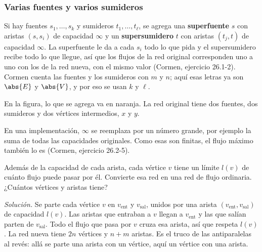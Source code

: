 \documentclass[11pt,letterpaper]{article}
\begin{document}
\subsubsection*{Varias fuentes y varios sumideros}

Si hay fuentes $s_1, \dots, s_k$ y sumideros $t_1, \dots, t_\ell$, se
agrega una \textbf{superfuente} $s$ con aristas $(s, s_i)$ de
capacidad $\infty$ y un \textbf{supersumidero} $t$ con aristas
$(t_j, t)$ de capacidad $\infty$. La superfuente le da a cada $s_i$
todo lo que pida y el supersumidero recibe todo lo que llegue, así que
los flujos de la red original corresponden uno a uno con los de la red
nueva, con el mismo valor (Cormen, ejercicio 26.1-2). Cormen cuenta
las fuentes y los sumideros con $m$ y $n$; aquí esas letras ya son
$\abs{E}$ y $\abs{V}$, y por eso se usan $k$ y $\ell$.

En la figura, lo que se agrega va en naranja. La red original tiene
dos fuentes, dos sumideros y dos vértices intermedios, $x$ y $y$.

\begin{center}
\end{center}

En una implementación, $\infty$ se reemplaza por un número grande, por
ejemplo la suma de todas las capacidades originales. Como esas son
finitas, el flujo máximo también lo es (Cormen, ejercicio 26.2-5).

\begin{ejercicio}
  Además de la capacidad de cada arista, cada vértice $v$ tiene un
  límite $l(v)$ de cuánto flujo puede pasar por él. Convierte esa red
  en una red de flujo ordinaria. ¿Cuántos vértices y aristas tiene?

  \textit{Solución.} Se parte cada vértice $v$ en $v_{\text{ent}}$ y
  $v_{\text{sal}}$, unidos por una arista $(v_{\text{ent}},
  v_{\text{sal}})$ de capacidad $l(v)$. Las aristas que entraban a $v$
  llegan a $v_{\text{ent}}$ y las que salían parten de
  $v_{\text{sal}}$. Todo el flujo que pasa por $v$ cruza esa arista,
  así que respeta $l(v)$. La red nueva tiene $2n$ vértices y $n + m$
  aristas. Es el truco de las antiparalelas al revés: allá se parte
  una arista con un vértice, aquí un vértice con una arista.
\end{ejercicio}
\end{document}
